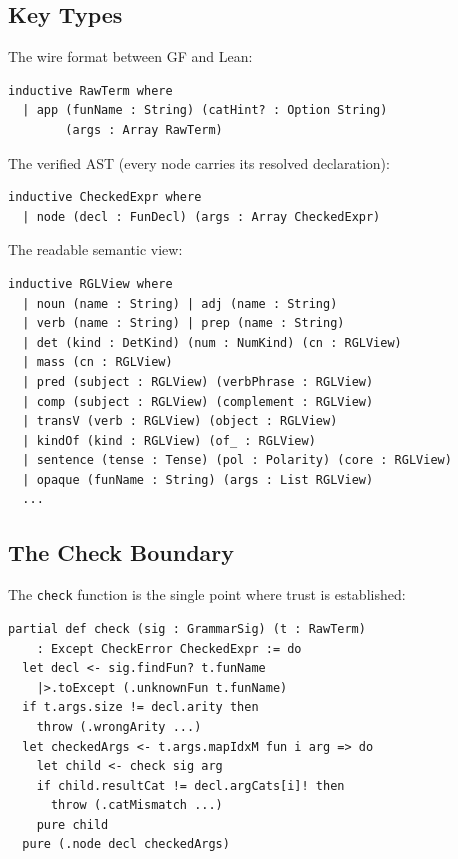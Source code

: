 \documentclass[]{article}
\newcommand{\code}[1]{\texttt{#1}}
\begin{document}
\subsection{Key Types}

The wire format between GF and Lean:

\begin{lstlisting}[language={}]
inductive RawTerm where
  | app (funName : String) (catHint? : Option String)
        (args : Array RawTerm)
\end{lstlisting}

The verified AST (every node carries its resolved declaration):

\begin{lstlisting}[language={}]
inductive CheckedExpr where
  | node (decl : FunDecl) (args : Array CheckedExpr)
\end{lstlisting}

The readable semantic view:

\begin{lstlisting}[language={}]
inductive RGLView where
  | noun (name : String) | adj (name : String)
  | verb (name : String) | prep (name : String)
  | det (kind : DetKind) (num : NumKind) (cn : RGLView)
  | mass (cn : RGLView)
  | pred (subject : RGLView) (verbPhrase : RGLView)
  | comp (subject : RGLView) (complement : RGLView)
  | transV (verb : RGLView) (object : RGLView)
  | kindOf (kind : RGLView) (of_ : RGLView)
  | sentence (tense : Tense) (pol : Polarity) (core : RGLView)
  | opaque (funName : String) (args : List RGLView)
  ...
\end{lstlisting}

\subsection{The Check Boundary}

The \code{check} function is the single point where trust is established:

\begin{lstlisting}[language={}]
partial def check (sig : GrammarSig) (t : RawTerm)
    : Except CheckError CheckedExpr := do
  let decl <- sig.findFun? t.funName
    |>.toExcept (.unknownFun t.funName)
  if t.args.size != decl.arity then
    throw (.wrongArity ...)
  let checkedArgs <- t.args.mapIdxM fun i arg => do
    let child <- check sig arg
    if child.resultCat != decl.argCats[i]! then
      throw (.catMismatch ...)
    pure child
  pure (.node decl checkedArgs)
\end{lstlisting}
\end{document}
